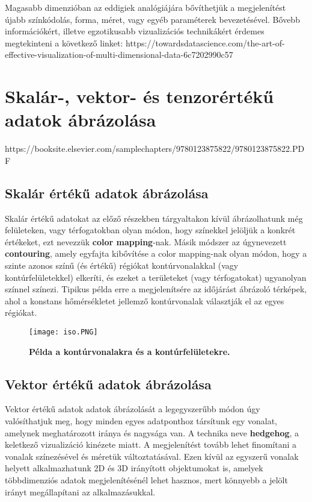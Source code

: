 \documentclass[12pt]{extarticle}
\begin{document}
 Magasabb dimenzióban az eddigiek analógiájára bővíthetjük a megjelenítést újabb színkódolás, forma, méret, vagy egyéb paraméterek bevezetésével. \newline
 Bővebb információkért, illetve egzotikusabb vizualizációs technikákért érdemes megtekinteni a következő linket: https://towardsdatascience.com/the-art-of-effective-visualization-of-multi-dimensional-data-6c7202990c57
 
 \section{Skalár-, vektor- és tenzorértékű adatok ábrázolása}
 https://booksite.elsevier.com/samplechapters/9780123875822/9780123875822.PDF
 \subsection{Skalár értékű adatok ábrázolása}
 
 Skalár értékű adatokat az előző részekben tárgyaltakon kívül ábrázolhatunk még felületeken, vagy térfogatokban olyan módon, hogy színekkel jelöljük a konkrét értékeket, ezt nevezzük \textbf{color mapping}-nak. \newline
 Másik módszer az úgynevezett \textbf{contouring}, amely egyfajta kibővítése a color mapping-nak olyan módon, hogy a szinte azonos színű (és értékű) régiókat kontúrvonalakkal (vagy kontúrfelületekkel) elkeríti, és ezeket a területeket (vagy térfogatokat) ugyanolyan színnel színezi. Tipikus példa erre a megjelenítsére az időjárást ábrázoló térképek, ahol a konstans hőmérsékletet jellemző kontúrvonalak választják el az egyes régiókat.
 
 \begin{figure}[H]
    \centering
    \texttt{[image: iso.PNG]}
    \caption{\textbf{Példa a kontúrvonalakra és a kontúrfelületekre.}}
    \label{fig:GeneralDiagram}
 \end{figure}
 
 \subsection{Vektor értékű adatok ábrázolása}
 Vektor értékű adatok adatok ábrázolását a legegyszerűbb módon úgy valósíthatjuk meg, hogy minden egyes adatponthoz társítunk egy vonalat, amelynek meghatározott iránya és nagysága van. A technika neve \textbf{hedgehog}, a keletkező vizualizáció kinézete miatt. A megjelenítést tovább lehet finomítani a vonalak színezésével és méretük változtatásával. Ezen kívül az egyszerű vonalak helyett alkalmazhatunk 2D és 3D irányított objektumokat is, amelyek többdimenziós adatok megjelenítésénél lehet hasznos, mert könnyebb a jelölt irányt megállapítani az alkalmazásukkal.
 
\end{document}
